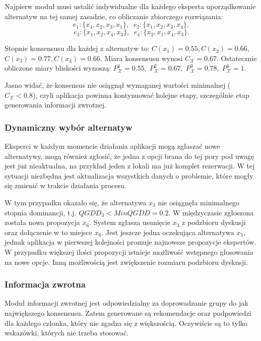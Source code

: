 Najpierw moduł musi ustalić indywidualne dla każdego eksperta uporządkowanie
alternatyw na tej samej zasadzie, co obliczanie zbiorczego rozwiązania:
$$e_1: \{ x_4, x_2, x_3, x_1 \}, \;\; e_2: \{ x_1, x_2, x_3, x_4 \},$$
$$e_3: \{ x_1, x_2, x_4, x_3 \}, \;\; e_4: \{ x_2, x_1, x_4, x_3 \}.$$

Stopnie konsensusu dla każdej z alternatyw to: $C(x_1) = 0.55, C(x_2) =
0.66,$ $C(x_3) = 0.77, C(x_4) = 0.66.$ Miara konsensusu wynosi
$C_{\mathcal{X}} = 0.67$.
Ostatecznie obliczone miary bliskości wynoszą: $P^1_{\mathcal{X}} = 0.55,\;
P^2_{\mathcal{X}} = 0.67,\; P^3_{\mathcal{X}} = 0.78,\; P^4_{\mathcal{X}} = 1$.

Jasno widać, że konsensus nie osiągnął wymaganej wartości minimalnej
($C_{\mathcal{X}} < 0.8$), czyli aplikacja powinna kontynuować kolejne etapy,
szczególnie etap generowania informacji zwrotnej.

\subsubsection{Dynamiczny wybór alternatyw}
Eksperci w każdym momencie działania aplikacji mogą zgłaszać nowe alternatywy,
mogą również zgłosić, że jedna z opcji brana do tej pory pod uwagę jest już
nieaktualna, na przykład jeden z lokali ma już komplet rezerwacji.
W tej sytuacji niezbędna jest aktualizacja wszystkich danych o problemie, które
mogły się zmienić w trakcie działania procesu.

W tym przypadku okazało się, że alternatywa $x_3$ nie osiągnęła minimalnego
stopnia dominancji, t.j. $QGDD_3 < MinQGDD = 0.2$. W międzyczasie zgłoszona
została nowa propozycja $x_6$. System zgłasza usunięcie $x_3$ z
podzbioru dyskusji oraz dołączenie w to miejsce $x_6$. Jest jeszcze jedna
oczekująca alternatywa $x_5$, jednak aplikacja w pierwszej kolejności promuje
najnowsze propozycje ekspertów. W przypadku większej ilości propozycji istnieje
możliwość wstępnego głosowania na nowe opcje. Inną możliwością jest zwiększenie
rozmiaru podzbioru dyskusji.

\subsubsection{Informacja zwrotna}
Moduł informacji zwrotnej jest odpowiedzialny za doprowadzanie grupy do jak
największego konsensusu. Zatem generowane są rekomendacje oraz podpowiedzi dla
każdego członka, który nie zgadza się z większością. Oczywiście są to tylko
wskazówki, których nie trzeba stosować.

